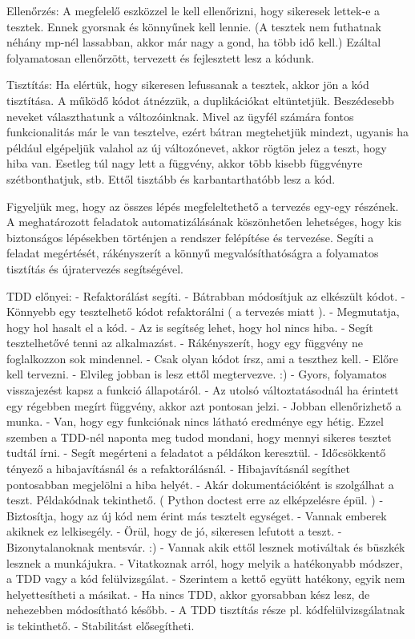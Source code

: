 Ellenőrzés:
     A megfelelő eszközzel le kell ellenőrizni, hogy sikeresek lettek-e a tesztek. Ennek gyorsnak és könnyűnek kell lennie. (A tesztek nem futhatnak néhány mp-nél lassabban, akkor már nagy a gond, ha több idő kell.) Ezáltal folyamatosan ellenőrzött, tervezett és fejlesztett lesz a kódunk.

Tisztítás:
     Ha elértük, hogy sikeresen lefussanak a tesztek, akkor jön a kód tisztítása. A működő kódot átnézzük, a duplikációkat eltüntetjük. Beszédesebb neveket választhatunk a változóinknak. Mivel az ügyfél számára fontos funkcionalitás már le van tesztelve, ezért bátran megtehetjük mindezt, ugyanis ha például elgépeljük valahol az új változónevet, akkor rögtön jelez a teszt, hogy hiba van. Esetleg túl nagy lett a függvény, akkor több kisebb függvényre szétbonthatjuk, stb. Ettől tisztább és karbantarthatóbb lesz a kód.

Figyeljük meg, hogy az összes lépés megfeleltethető a tervezés egy-egy részének. A meghatározott feladatok automatizálásának köszönhetően lehetséges, hogy kis biztonságos lépésekben történjen a rendszer felépítése és tervezése. Segíti a feladat megértését, rákényszerít a könnyű megvalósíthatóságra a folyamatos tisztítás és újratervezés segítségével.


TDD előnyei:
- Refaktorálást segíti.
     - Bátrabban módosítjuk az elkészült kódot.
     - Könnyebb egy tesztelhető kódot refaktorálni ( a tervezés miatt ).
- Megmutatja, hogy hol hasalt el a kód.
- Az is segítség lehet, hogy hol nincs hiba.
- Segít tesztelhetővé tenni az alkalmazást.
- Rákényszerít, hogy egy függvény ne foglalkozzon sok mindennel.
- Csak olyan kódot írsz, ami a teszthez kell.
- Előre kell tervezni.
- Elvileg jobban is lesz ettől megtervezve. :)
- Gyors, folyamatos visszajezést kapsz a funkció állapotáról.
- Az utolsó változtatásodnál ha érintett egy régebben megírt függvény, akkor azt pontosan jelzi.
- Jobban ellenőrizhető a munka.
     - Van, hogy egy funkciónak nincs látható eredménye egy hétig. Ezzel szemben a TDD-nél naponta meg tudod mondani, hogy mennyi sikeres tesztet tudtál írni.
- Segít megérteni a feladatot a példákon keresztül.
- Időcsökkentő tényező a hibajavításnál és a refaktorálásnál.
- Hibajavításnál segíthet pontosabban megjelölni a hiba helyét.
- Akár dokumentációként is szolgálhat a teszt. Példakódnak tekinthető. ( Python doctest erre az elképzelésre épül. )
- Biztosítja, hogy az új kód nem érint más tesztelt egységet.
- Vannak emberek akiknek ez lelkisegély.
     - Örül, hogy de jó, sikeresen lefutott a teszt.
     - Bizonytalanoknak mentsvár. :)
     - Vannak akik ettől lesznek motiváltak és büszkék lesznek a munkájukra.
- Vitatkoznak arról, hogy melyik a hatékonyabb módszer, a TDD vagy a kód felülvizsgálat.
     - Szerintem a kettő együtt hatékony, egyik nem helyettesítheti a másikat.
- Ha nincs TDD, akkor gyorsabban kész lesz, de nehezebben módosítható később.
- A TDD tisztítás része pl. kódfelülvizsgálatnak is tekinthető.
- Stabilitást elősegítheti.


